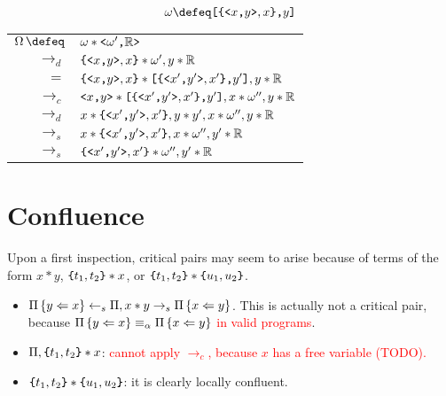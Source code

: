 \documentclass{article}
\begin{document}
\begin{example}

\[\omega \defeq \cs{\contr{\ca{x}{y}, x}}{y}\]

\bgroup
\def\arraystretch{1.3}
\begin{tabular}{rl}
    $\Omega \, \defeq $ & $\omega * \ca{\omega'}{\Result}$ \\
    $\to_d$ & $\contr{\ca{x}{y}, x} * \omega', y * \Result$ \\
    $=$ & $\contr{\ca{x}{y}, x} * \cs{\contr{\ca{x'}{y'}, x'}}{y'}, y * \Result$ \\
    $\to_c$ & $\ca{x}{y} * \cs{\contr{\ca{x'}{y'}, x'}}{y'}, x * \omega'', y * \Result$ \\
    $\to_d$ & $x * \contr{\ca{x'}{y'}, x'}, {y}*{y'}, x * \omega'', y * \Result$ \\
    $\to_s$ & $x * \contr{\ca{x'}{y'}, x'}, x * \omega'', y' * \Result$ \\
    $\to_s$ & $\contr{\ca{x'}{y'}, x'} * \omega'', y' * \Result$ \\
\end{tabular}
\egroup
\end{example}

\section{Confluence}
Upon a first inspection, critical pairs may seem to arise because of terms of the form $x * y$, $\contr{t_1, t_2} * x$, or $\contr{t_1, t_2} * \contr{u_1, u_2}$.
\begin{itemize}
    \item $\Pi\treplace{y \Leftarrow x} \leftarrow_s \Pi, x * y \to_s \Pi\treplace{x \Leftarrow y}$. This is actually not a critical pair, because $\Pi\treplace{y \Leftarrow x} \equiv_\alpha \Pi\treplace{x \Leftarrow y}$ \textcolor{red}{ in valid programs}.
    \item $\Pi, \contr{t_1, t_2} * x$: \textcolor{red}{cannot apply $\to_c$, because $x$ has a free variable (TODO).}
    \item $\contr{t_1, t_2} * \contr{u_1, u_2}$: it is clearly locally confluent.
\end{itemize}

\vspace{2em}

\end{document}

